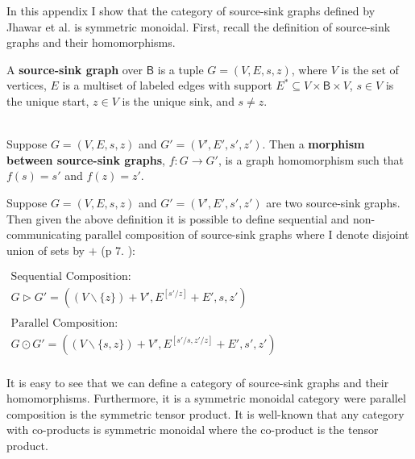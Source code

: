 In this appendix I show that the category of source-sink graphs
defined by Jhawar et al. \cite{Jhawar:2015} is symmetric monoidal.
First, recall the definition of source-sink graphs and their
homomorphisms.
\begin{definition}
  \label{def:source-sink-graphs}
  A \textbf{source-sink graph} over $\mathsf{B}$ is a tuple $G = (V ,
  E, s, z)$, where $V$ is the set of vertices, $E$ is a multiset of
  labeled edges with support $E^* \subseteq V \times \mathsf{B} \times
  V$, $s \in V$ is the unique start, $z \in V$ is the unique sink, and
  $s \neq z$.

  \ \\
  \noindent
  Suppose $G = (V , E, s, z)$ and $G' = (V' , E', s', z')$.  Then a
  \textbf{morphism between source-sink graphs}, $f : G \to G'$, is a
  graph homomorphism such that $f(s) = s'$ and $f(z) = z'$.
\end{definition}

Suppose $G = (V , E, s, z)$ and $G' = (V' , E', s', z')$ are two
source-sink graphs. Then given the above definition it is possible to
define sequential and non-communicating parallel composition of
source-sink graphs where I denote disjoint union of sets by $+$ (p
7. \cite{Jhawar:2015}):
\begin{center}
  \small
  \begin{math}
    \begin{array}{lll}
      \text{Sequential Composition}:\\
      G \rhd G' = ((V \mathop{\backslash} \{z \}) + V', E^{[s'/z]} + E', s , z')\\\\
      \text{Parallel Composition}:\\
      G \odot G'
      = ((V \mathop{\backslash} \{s,z\}) + V', E^{[s'/s,z'/z]} + E', s' , z')\\
    \end{array}
  \end{math}
\end{center}

It is easy to see that we can define a category of source-sink graphs
and their homomorphisms.  Furthermore, it is a symmetric monoidal
category were parallel composition is the symmetric tensor product.
It is well-known that any category with co-products is symmetric
monoidal where the co-product is the tensor product.

